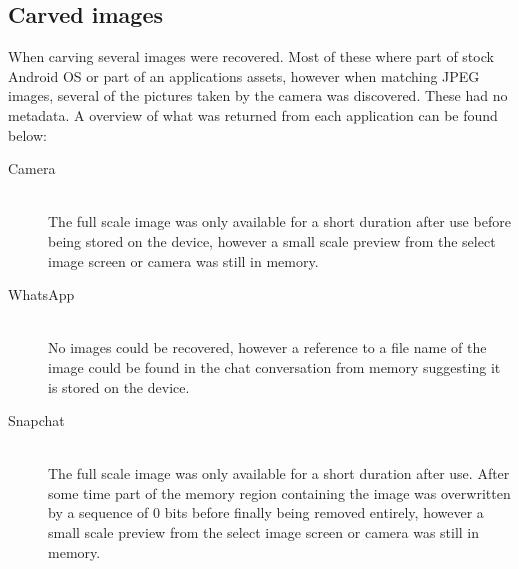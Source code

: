 \subsection{Carved images}
When carving several images were recovered. Most of these where part of stock Android OS or part of an applications assets, however when matching JPEG images, several of the pictures taken by the camera was discovered. These had no metadata. A overview of what was returned from each application can be found below:
\begin{description}
\item[Camera]\hfill\\
The full scale image was only available for a short duration after use before being stored on the device, however a small scale preview from the select image screen or camera was still in memory.
\item[WhatsApp]\hfill\\
No images could be recovered, however a reference to a file name of the image could be found in the chat conversation from memory suggesting it is stored on the device.
\item[Snapchat]\hfill\\
The full scale image was only available for a short duration after use. After some time part of the memory region containing the image was overwritten by a sequence of 0 bits before finally being removed entirely, however a small scale preview from the select image screen or camera was still in memory.
\end{description}